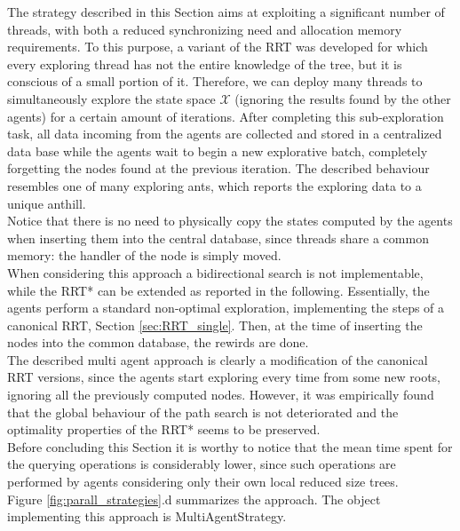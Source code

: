 The strategy described in this Section aims at exploiting a significant number of threads, with both a reduced synchronizing need and allocation memory requirements. To this purpose, a variant of the RRT was developed for which every exploring thread has not the entire knowledge of the tree, but it is conscious of a small portion of it. 
Therefore, we can deploy many threads to simultaneously explore the state space $\mathcal{X}$ (ignoring the results found by the other agents) for
a certain amount of iterations. After completing this sub-exploration task, all data incoming from the agents are collected and stored in a centralized data base while the agents wait to begin a new explorative batch, completely forgetting the nodes found at the previous iteration. 
The described behaviour resembles one of many exploring ants, which reports the exploring data to a unique anthill.
\\
Notice that there is no need to physically copy the states computed by the agents when inserting them into the central database, since threads share a common memory: the handler of the node is simply moved. 
\\
When considering this approach a bidirectional search is not implementable, while the RRT* can be extended as reported in the following.
Essentially, the agents perform a standard non-optimal exploration, implementing the steps of a canonical RRT, Section \ref{sec:RRT_single}.
Then, at the time of inserting the nodes into the common database, the rewirds are done.
\\
The described multi agent approach is clearly a modification of the canonical RRT versions, since the agents start exploring every time from some new roots, ignoring all the previously computed nodes. However, it was empirically found that the global behaviour of the path search is not deteriorated and the optimality properties of the RRT* seems to be preserved.
\\
Before concluding this Section it is worthy to notice that the mean time spent for the querying operations is considerably
lower, since such operations are performed by agents considering only their own local reduced size trees.
\\
Figure \ref{fig:parall_strategies}.d summarizes the approach.
The object implementing this approach is MultiAgentStrategy.
